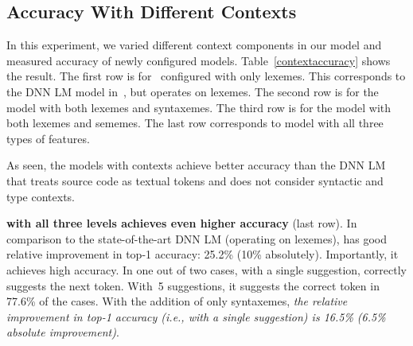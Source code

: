 \subsection{Accuracy With Different Contexts}



In this experiment, we varied different context components in our
model and measured accuracy of newly configured
models. Table~\ref{contextaccuracy} shows the result. The first row is
for {\tool}~configured with only lexemes. This corresponds to the DNN
LM model in~\cite{DNNLM12}, but operates on lexemes. The second row is
for the model with both lexemes and syntaxemes. The third row is for
the model with both lexemes and sememes. The last row corresponds to
{\tool} model with all three types of features.

As seen, the models with contexts achieve better accuracy than the DNN
LM that treats source code as textual tokens and does not consider
syntactic and type contexts.

{\bf {\tool} with all three levels achieves even higher
accuracy} (last row). In comparison to the state-of-the-art DNN LM
(operating on lexemes), {\tool} has good relative improvement in
top-1 accuracy: 25.2\% (10\% absolutely).
%
Importantly, it achieves high accuracy. In one out of two cases,
with a single suggestion, {\tool} correctly suggests the
next token. 
With~5 suggestions, it suggests the correct token in 77.6\% of the
cases.
%
%
With the addition of only syntaxemes, {\em the relative improvement in
top-1 accuracy (i.e., with a single suggestion) is 16.5\% (6.5\%
absolute improvement)}. 


%
%

